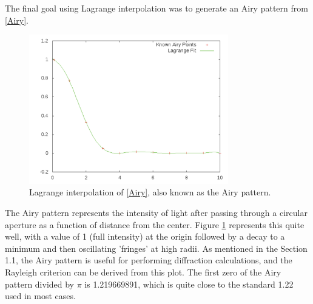 \documentclass[12pt]{article}
\begin{document}
The final goal using Lagrange interpolation was to generate an Airy pattern from \eqref{Airy}.
\begin{figure}[h!]
\centering
\includegraphics[width =120 mm, height = 65mm]{Ex_3_3_airy.pdf}
\caption{Lagrange interpolation of \eqref{Airy}, also known as the Airy pattern.}
\label{fig:3.3.airy}
\end{figure}
The Airy pattern represents the intensity of light after passing through a circular aperture as a function of distance from the center.  Figure \ref{fig:3.3.airy} represents this quite well, with a value of 1 (full intensity) at the origin followed by a decay to a minimum and then oscillating 'fringes' at high radii.  As mentioned in the Section 1.1, the Airy pattern is useful for performing diffraction calculations, and the Rayleigh criterion can be derived from this plot.  The first zero of the Airy pattern divided by $\pi$ is 1.219669891, which is quite close to the standard 1.22 used in most cases.  
\end{document}
